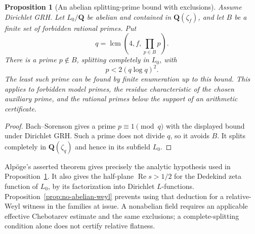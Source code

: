 \documentclass[11pt]{article}
\newtheorem{proposition}[theorem]{Proposition}
\theoremstyle{definition}
\theoremstyle{remark}
\newcommand{\Q}{\mathbf Q}
\begin{document}
\begin{proposition}[An abelian splitting-prime bound with exclusions]
\label{prop:prime}
Assume Dirichlet GRH. Let $L_0/\Q$ be abelian and contained
in $\Q(\zeta_f)$, and let $B$ be a finite set of forbidden
rational primes. Put
\[
 q=\operatorname{lcm}\left(4,f,\prod_{p\in B}p\right).
\]
There is a prime $p\notin B$, splitting completely in $L_0$,
with
\begin{equation}
 p<2(q\log q)^2.
 \label{eq:prime}
\end{equation}
The least such prime can be found by finite enumeration up
to this bound. This applies to forbidden model primes, the
residue characteristic of the chosen auxiliary prime, and the
rational primes below the support of an arithmetic certificate.
\end{proposition}
\begin{proof}
Bach--Sorenson \cite[Theorem 5.3, pp.~1731--1732]{BachSorenson}
gives a prime $p\equiv1\pmod q$ with the displayed bound under
Dirichlet GRH. Such a prime does not divide $q$, so it avoids
$B$. It splits completely in $\Q(\zeta_q)$ and hence in its
subfield $L_0$.
\end{proof}

Alp\"oge's asserted theorem gives precisely the analytic
hypothesis used in Proposition~\ref{prop:prime}. It also gives
the half-plane $\operatorname{Re}s>1/2$ for the Dedekind zeta
function of $L_0$, by its factorization into Dirichlet
$L$-functions. Proposition~\ref{prop:no-abelian-weyl} prevents using
that deduction for a relative-Weyl witness in the families at
issue. A nonabelian field requires an applicable effective
Chebotarev estimate and the same exclusions; a complete-splitting
condition alone does not certify relative flatness.
\end{document}
